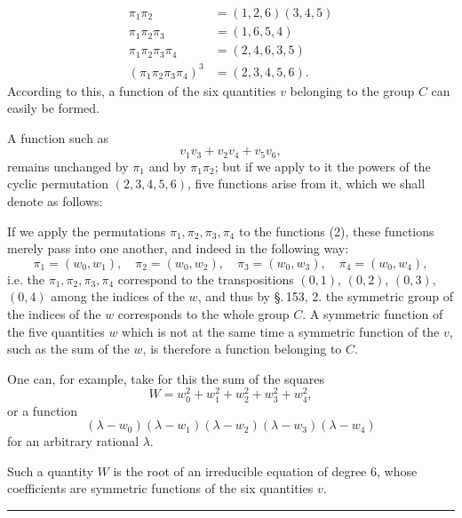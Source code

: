 \[
\begin{aligned}
\pi_1 \pi_2 &= (1, 2, 6) (3, 4, 5) \\
\pi_1 \pi_2 \pi_3 &= (1, 6, 5, 4) \\
\pi_1 \pi_2 \pi_3 \pi_4 &= (2, 4, 6, 3, 5) \\
(\pi_1 \pi_2 \pi_3 \pi_4)^3 &= (2, 3, 4, 5, 6).
\end{aligned}
\]
According to this, a function of the six quantities $v$ belonging to the group $C$ can easily be formed.

A function such as
\[
v_1 v_3 + v_2 v_4 + v_5 v_6,
\]
remains unchanged by $\pi_1$ and by $\pi_1 \pi_2$; but if we apply to it the powers of the cyclic permutation $(2, 3, 4, 5, 6)$, five functions arise from it, which we shall denote as follows:

If we apply the permutations $\pi_1, \pi_2, \pi_3, \pi_4$ to the functions (2), these functions merely pass into one another, and indeed in the following way:
\[
\pi_1 = (w_0, w_1), \quad \pi_2 = (w_0, w_2), \quad \pi_3 = (w_0, w_3), \quad \pi_4 = (w_0, w_4),
\]
i.e. the $\pi_1, \pi_2, \pi_3, \pi_4$ correspond to the transpositions $(0, 1)$, $(0, 2)$, $(0, 3)$, $(0, 4)$ among the indices of the $w$, and thus by \S.\,153, 2. the symmetric group of the indices of the $w$ corresponds to the whole group $C$. A symmetric function of the five quantities $w$ which is not at the same time a symmetric function of the $v$, such as the sum of the $w$, is therefore a function belonging to $C$.

One can, for example, take for this the sum of the squares
\[
W = w_0^2 + w_1^2 + w_2^2 + w_3^2 + w_4^2,
\]
or a function
\[
(\lambda - w_0) (\lambda - w_1) (\lambda - w_2) (\lambda - w_3) (\lambda - w_4)
\]
for an arbitrary rational $\lambda$.

Such a quantity $W$ is the root of an irreducible equation of degree $6$, whose coefficients are symmetric functions of the six quantities $v$.

\begin{center}
\rule{3cm}{0.4pt}
\end{center}
